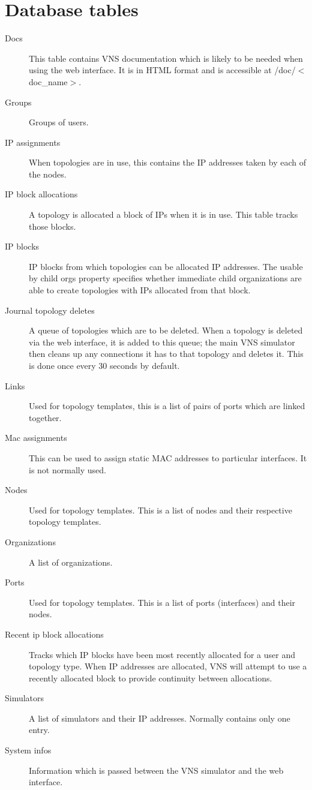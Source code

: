 \documentclass[a4paper,12pt]{report}
\begin{document}
\section{Database tables}
\begin{description}
\item[Docs]  This table contains VNS documentation which is likely to be needed when using the web interface.  It is in HTML format and is accessible at /doc/$<$doc\_name$>$.
\item[Groups]  Groups of users.
\item[IP assignments]  When topologies are in use, this contains the IP addresses taken by each of the nodes.
\item[IP block allocations]  A topology is allocated a block of IPs when it is in use.  This table tracks those blocks.
\item[IP blocks]  IP blocks from which topologies can be allocated IP addresses.  The usable by child orgs property specifies whether immediate child organizations are able to create topologies with IPs allocated from that block.
\item[Journal topology deletes]  A queue of topologies which are to be deleted.  When a topology is deleted via the web interface, it is added to this queue; the main VNS simulator then cleans up any connections it has to that topology and deletes it.  This is done once every 30 seconds by default.
\item[Links]  Used for topology templates, this is a list of pairs of ports which are linked together.
\item[Mac assignments]  This can be used to assign static MAC addresses to particular interfaces.  It is not normally used.
\item[Nodes]  Used for topology templates.  This is a list of nodes and their respective topology templates.
\item[Organizations]  A list of organizations.
\item[Ports]  Used for topology templates.  This is a list of ports (interfaces) and their nodes.
\item[Recent ip block allocations]  Tracks which IP blocks have been most recently allocated for a user and topology type.  When IP addresses are allocated, VNS will attempt to use a recently allocated block to provide continuity between allocations.
\item[Simulators]  A list of simulators and their IP addresses.  Normally contains only one entry.
\item[System infos]  Information which is passed between the VNS simulator and the web interface.

\end{description}
\end{document}
